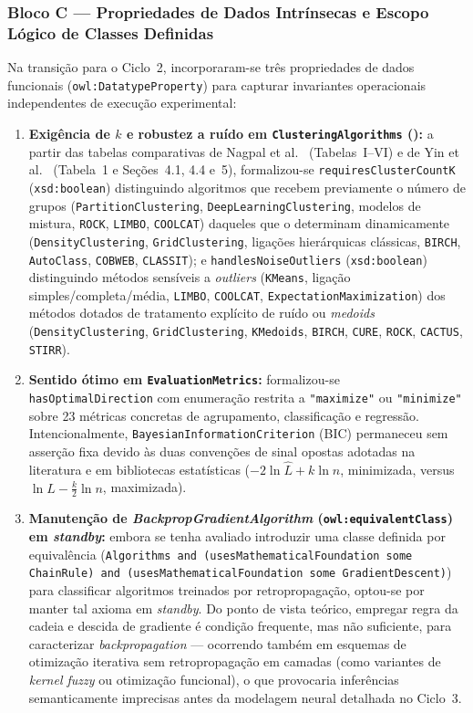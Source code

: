 \documentclass[11pt,a4paper]{article}
\newcommand{\onto}[1]{\texttt{#1}}
\begin{document}
\subsubsection{Bloco C --- Propriedades de Dados Intrínsecas e Escopo Lógico de Classes Definidas}

Na transição para o Ciclo~2, incorporaram-se três propriedades de dados funcionais (\onto{owl:DatatypeProperty}) para capturar invariantes operacionais independentes de execução experimental:
\begin{enumerate}[leftmargin=*,nosep]
  \item \textbf{Exigência de $k$ e robustez a ruído em \onto{ClusteringAlgorithms} (\cite{nagpal2013review,yin2026rapid}):} a partir das tabelas comparativas de Nagpal et al.~\cite{nagpal2013review} (Tabelas~I--VI) e de Yin et al.~\cite{yin2026rapid} (Tabela~1 e Seções~4.1, 4.4 e~5), formalizou-se \onto{requiresClusterCountK} (\onto{xsd:boolean}) distinguindo algoritmos que recebem previamente o número de grupos (\onto{PartitionClustering}, \onto{DeepLearningClustering}, modelos de mistura, \onto{ROCK}, \onto{LIMBO}, \onto{COOLCAT}) daqueles que o determinam dinamicamente (\onto{DensityClustering}, \onto{GridClustering}, ligações hierárquicas clássicas, \onto{BIRCH}, \onto{AutoClass}, \onto{COBWEB}, \onto{CLASSIT}); e \onto{handlesNoiseOutliers} (\onto{xsd:boolean}) distinguindo métodos sensíveis a \emph{outliers} (\onto{KMeans}, ligação simples/completa/média, \onto{LIMBO}, \onto{COOLCAT}, \onto{ExpectationMaximization}) dos métodos dotados de tratamento explícito de ruído ou \emph{medoids} (\onto{DensityClustering}, \onto{GridClustering}, \onto{KMedoids}, \onto{BIRCH}, \onto{CURE}, \onto{ROCK}, \onto{CACTUS}, \onto{STIRR}).
  \item \textbf{Sentido ótimo em \onto{EvaluationMetrics}:} formalizou-se \onto{hasOptimalDirection} com enumeração restrita a \onto{"maximize"} ou \onto{"minimize"} sobre 23 métricas concretas de agrupamento, classificação e regressão. Intencionalmente, \onto{BayesianInformationCriterion} (BIC) permaneceu sem asserção fixa devido às duas convenções de sinal opostas adotadas na literatura e em bibliotecas estatísticas ($-2\ln\hat{L} + k\ln n$, minimizada, versus $\ln\hat{L} - \frac{k}{2}\ln n$, maximizada).
  \item \textbf{Manutenção de \emph{BackpropGradientAlgorithm} (\onto{owl:equivalentClass}) em \emph{standby}:} embora se tenha avaliado introduzir uma classe definida por equivalência (\onto{Algorithms and (usesMathematicalFoundation some ChainRule) and (usesMathematicalFoundation some GradientDescent)}) para classificar algoritmos treinados por retropropagação, optou-se por manter tal axioma em \emph{standby}. Do ponto de vista teórico, empregar regra da cadeia e descida de gradiente é condição frequente, mas não suficiente, para caracterizar \emph{backpropagation} --- ocorrendo também em esquemas de otimização iterativa sem retropropagação em camadas (como variantes de \emph{kernel fuzzy} ou otimização funcional), o que provocaria inferências semanticamente imprecisas antes da modelagem neural detalhada no Ciclo~3.
\end{enumerate}
\end{document}
